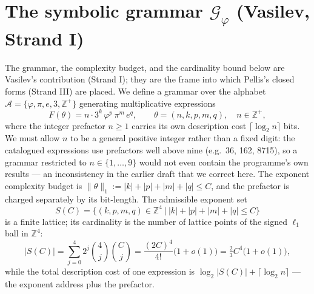 \documentclass[11pt]{article}
\newcommand{\phigr}{\varphi}
\begin{document}
\section{The symbolic grammar $\mathcal{G}_{\phigr}$ (Vasilev, Strand I)}\label{sec:grammar}
The grammar, the complexity budget, and the cardinality bound below are Vasilev's contribution (Strand I); they are the frame into which Pellis's closed forms (Strand III) are placed. We define a grammar over the alphabet $\mathcal{A} = \{\phigr, \pi, e, 3, \mathbb{Z}^{+}\}$ generating multiplicative expressions
\begin{equation}
F(\theta) = n \cdot 3^{k}\,\phigr^{p}\,\pi^{m}\,e^{q}, \qquad \theta = (n,k,p,m,q), \quad n \in \mathbb{Z}^{+}, \label{eq:expr}
\end{equation}
where the integer prefactor $n \ge 1$ carries its own description cost $\lceil \log_2 n \rceil$ bits. We must allow $n$ to be a general positive integer rather than a fixed digit: the catalogued expressions use prefactors well above nine (e.g.\ 36, 162, 8715), so a grammar restricted to $n \in \{1,\dots,9\}$ would not even contain the programme's own results --- an inconsistency in the earlier draft that we correct here. The exponent complexity budget is $\|\theta\|_1 := |k| + |p| + |m| + |q| \le C$, and the prefactor is charged separately by its bit-length. The admissible exponent set
\begin{equation}
S(C) = \bigl\{ (k,p,m,q) \in \mathbb{Z}^4 \ \big|\ |k| + |p| + |m| + |q| \le C \bigr\} \label{eq:Sset}
\end{equation}
is a finite lattice; its cardinality is the number of lattice points of the signed $\ell_1$ ball in $\mathbb{Z}^4$:
\begin{equation}
|S(C)| = \sum_{j=0}^{4} 2^{j}\binom{4}{j}\binom{C}{j} = \frac{(2C)^4}{4!}\bigl(1+o(1)\bigr) = \tfrac{2}{3}C^4\bigl(1+o(1)\bigr), \label{eq:card}
\end{equation}
while the total description cost of one expression is $\log_2 |S(C)| + \lceil \log_2 n \rceil$ --- the exponent address plus the prefactor.
\end{document}
